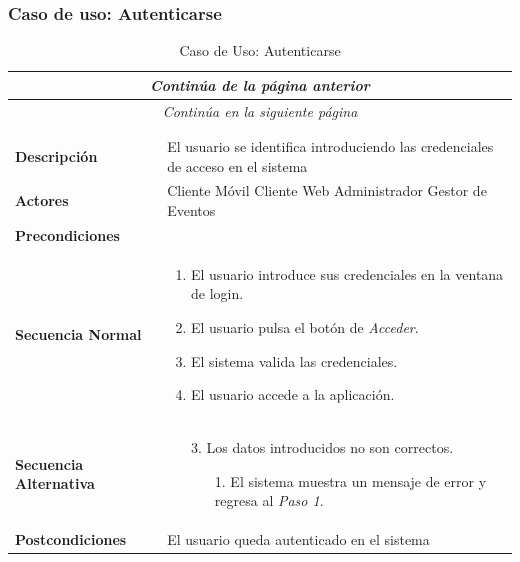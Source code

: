 \subsubsection*{Caso de uso: Autenticarse}
\begin{longtable}{| p{4cm} | p{10cm} |}
\endfirsthead
\multicolumn{2}{c}{\textit{Continúa de la página anterior}}\\[12pt]
\hline
\endhead
\hline
\multicolumn{2}{c}{\textit{Continúa en la siguiente página}} \\
\endfoot
\hline
\caption{Caso de Uso: Autenticarse}\label{fig:1}\\
\endlastfoot


\hline
\multicolumn{2}{|c|}{\textbf{CU$<$01$>$ - Autenticarse}} \\

\hline
\textbf{Descripción} &
El usuario se identifica introduciendo las credenciales de acceso en el sistema \\

\hline
\textbf{Actores} &
Cliente Móvil\newline
Cliente Web\newline
Administrador\newline
Gestor de Eventos\\

\hline
\textbf{Precondiciones} &
\\

\hline
\textbf{Secuencia Normal} &\mbox{}\par\vspace{-\baselineskip}
\begin{enumerate}[leftmargin=0.7cm, topsep=0.1cm]
\item El usuario introduce sus credenciales en la ventana de login. 
\item El usuario pulsa el botón de \textit{Acceder}.
\item El sistema valida las credenciales.
\item El usuario accede a la aplicación.
\end{enumerate}\\

\hline
\textbf{Secuencia Alternativa} &\mbox{}\par\vspace{-\baselineskip}
\begin{enumerate}[leftmargin=0.9cm, topsep=0.1cm]
\item[3.] Los datos introducidos no son correctos.
	\begin{itemize}
	\item[1.] El sistema muestra un mensaje de error y regresa al \textit{Paso 1}.
	\end{itemize}

\end{enumerate}\\

\hline
\textbf{Postcondiciones} & 
El usuario queda autenticado en el sistema\\
\hline
\end{longtable}




